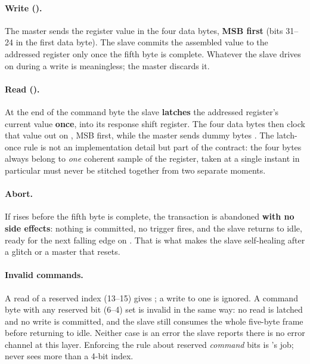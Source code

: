 \paragraph{Write ().}
The master sends the register value in the four data bytes, \textbf{MSB first} (bits 31--24 in the
first data byte). The slave commits the assembled value to the addressed register only once the fifth
byte is complete. Whatever the slave drives on  during a write is meaningless; the master
discards it.

\paragraph{Read ().}
At the end of the command byte the slave \textbf{latches} the addressed register's current value
\textbf{once}, into its response shift register. The four data bytes then clock that value out on
, MSB first, while the master sends dummy bytes . The latch-once rule is not an
implementation detail but part of the contract: the four bytes always belong to \emph{one} coherent
sample of the register, taken at a single instant \textemdash{}  in particular must never
be stitched together from two separate moments.

\paragraph{Abort.}
If  rises before the fifth byte is complete, the transaction is abandoned \textbf{with no
side effects}: nothing is committed, no trigger fires, and the slave returns to idle, ready for the
next falling edge on . That is what makes the slave self-healing after a glitch or a master
that resets.

\paragraph{Invalid commands.}
A read of a reserved index (13--15) gives ; a write to one is ignored. A command byte
with any reserved bit (6--4) set is invalid in the same way: no read is latched and no write is
committed, and the slave still consumes the whole five-byte frame before returning to idle. Neither
case is an error the slave reports \textemdash{} there is no error channel at this layer. Enforcing
the rule about reserved \emph{command} bits is 's job;  never
sees more than a 4-bit index.

